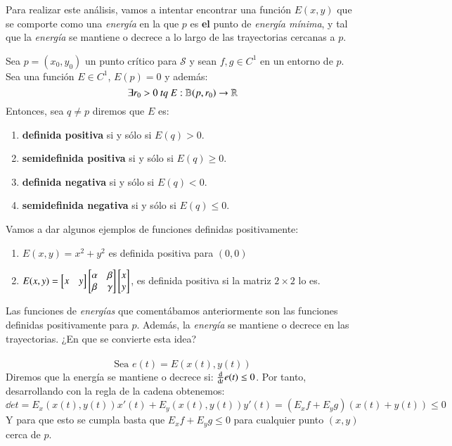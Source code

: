 Para realizar este análisis, vamos a intentar encontrar una función $E(x, y)$ que se comporte como una \textit{energía} en la que $p$ es \textbf{el} punto de \textit{energía mínima}, y tal que la \textit{energía} se mantiene o decrece a lo largo de las trayectorias cercanas a $p$.
\begin{dfn}
    Sea $p = (x_0, y_0)$ un punto crítico para $\mathcal{S}$ y sean $f, g \in C^1$ en un entorno de $p$.\\
    Sea una función $E \in C^1$, $E(p) = 0$ y además:
    $$
        \exists r_0 > 0\ tq\ E: \mathbb{B}(p, r_0) \to \mathbb{R}
    $$
    Entonces, sea $q \neq p$ diremos que $E$ es:
    \begin{enumerate}
        \item \textbf{definida positiva} si y sólo si $E(q) > 0$.
        \item \textbf{semidefinida positiva} si y sólo si $E(q) \geq 0$.
        \item \textbf{definida negativa} si y sólo si $E(q) < 0$.
        \item \textbf{semidefinida negativa} si y sólo si $E(q) \leq 0$.
    \end{enumerate}
\end{dfn}
\begin{obs}
    Vamos a dar algunos ejemplos de funciones definidas positivamente:
    \begin{enumerate}
        \item $E(x, y) = x^2 + y^2$ es definida positiva para $(0,0)$
        \item $E(x, y) = \mx{x & y} \mx{\alpha & \beta \\ \beta & \gamma} \mx{x \\ y}$, es definida positiva si la matriz $2 \times 2$ lo es.
    \end{enumerate}
\end{obs}
\begin{dfn}\label{dfn:energia}
    Las funciones de \textit{energías} que comentábamos anteriormente son las funciones definidas positivamente para $p$. Además, la \textit{energía} se mantiene o decrece en las trayectorias. ¿En que se convierte esta idea?\\\\
    $$
    \text{Sea } e(t) = E(x(t), y(t))
    $$
    Diremos que la energía se mantiene o decrece si: $\frac{\mathrm{d}}{\mathrm{d}t} e(t) \leq 0$. Por tanto, desarrollando con la regla de la cadena obtenemos:
    $$
    \dd{e}{t} = E_x(x(t), y(t)) x'(t) + E_y(x(t), y(t)) y'(t) = (E_x f + E_y g) (x(t) + y(t)) \leq 0
    $$
    Y para que esto se cumpla basta que $E_x f + E_y g \leq 0$ para cualquier punto $(x, y)$ cerca de $p$.
\end{dfn}

